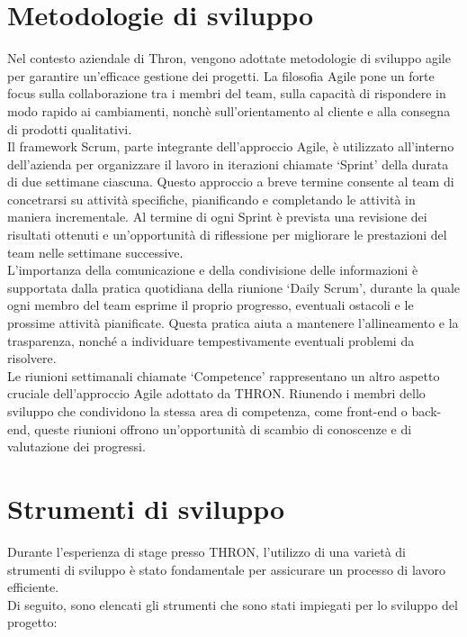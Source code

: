 \section{Metodologie di sviluppo}
Nel contesto aziendale di Thron, vengono adottate metodologie di sviluppo agile per garantire un'efficace
gestione dei progetti. La filosofia Agile pone un forte focus sulla collaborazione tra i membri del team,
sulla capacità di rispondere in modo rapido ai cambiamenti, nonchè sull'orientamento al cliente e alla consegna di prodotti qualitativi.\\
Il framework Scrum, parte integrante dell'approccio Agile, è utilizzato all'interno dell'azienda per organizzare il lavoro in iterazioni chiamate
`Sprint' della durata di due settimane ciascuna. Questo approccio a breve termine consente al team di concetrarsi su attività specifiche, pianificando
e completando le attività in maniera incrementale. Al termine di ogni Sprint è prevista una revisione dei risultati ottenuti e un'opportunità 
di riflessione per migliorare le prestazioni del team nelle settimane successive.\\
L'importanza della comunicazione e della condivisione delle informazioni è supportata dalla pratica quotidiana della riunione `Daily Scrum', durante la quale
ogni membro del team esprime il proprio progresso, eventuali ostacoli e le prossime attività pianificate. Questa pratica aiuta a mantenere l'allineamento e
la trasparenza, nonché a individuare tempestivamente eventuali problemi da risolvere.\\
Le riunioni settimanali chiamate `Competence' rappresentano un altro aspetto cruciale dell'approccio Agile adottato da THRON. Riunendo i membri dello sviluppo 
che condividono la stessa area di competenza, come front-end o back-end, queste riunioni offrono un'opportunità di scambio di conoscenze e di valutazione dei progressi.

\section{Strumenti di sviluppo}
Durante l'esperienza di stage presso THRON, l'utilizzo di una varietà di strumenti di sviluppo è stato fondamentale per assicurare un processo di lavoro efficiente.\\
Di seguito, sono elencati gli strumenti che sono stati impiegati per lo sviluppo del progetto:

